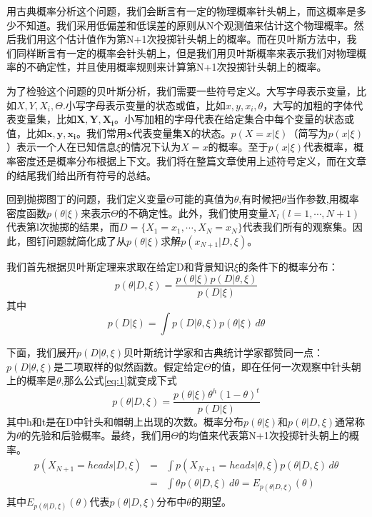 \documentclass[10pt,a4paper]{article}
\begin{document}
\begin{CJK*}{UTF8}{gkai}
用古典概率分析这个问题，我们会断言有一定的物理概率针头朝上，而这概率是多少不知道。我们采用低偏差和低误差的原则从N个观测值来估计这个物理概率。然后我们用这个估计值作为第N+1次投掷针头朝上的概率。而在贝叶斯方法中，我们同样断言有一定的概率会针头朝上，但是我们用贝叶斯概率来表示我们对物理概率的不确定性，并且使用概率规则来计算第N+1次投掷针头朝上的概率。


为了检验这个问题的贝叶斯分析，我们需要一些符号定义。大写字母表示变量，比如$X,Y,X_i,\Theta$.小写字母表示变量的状态或值，比如$x,y,x_i,\theta$，大写的加粗的字体代表变量集，比如$\mathbf{X},\mathbf{Y},\mathbf{X_i}$。小写加粗的字母代表在给定集合中每个变量的状态或值，比如$\mathbf{x},\mathbf{y},\mathbf{x_i}$。我们常用$\mathbf{x}$代表变量集$\mathbf{X}$的状态。$p(X=x|\xi)$（简写为$p(x|\xi)$）表示一个人在已知信息$\xi$的情况下认为$X=x$的概率。至于$p(x|\xi)$代表概率，概率密度还是概率分布根据上下文。我们将在整篇文章使用上述符号定义，而在文章的结尾我们给出所有符号的总结。


回到抛掷图丁的问题，我们定义变量$\Theta$可能的真值为$\theta$,有时候把$\theta$当作参数,用概率密度函数$p(\theta|\xi)$来表示$\Theta$的不确定性。此外，我们使用变量$X_l(l=1,\cdots,N+1)$代表第l次抛掷的结果，而$D=\{X_1=x_1,\cdots,X_N=x_N\}$代表我们所有的观察集。因此，图钉问题就简化成了从$p(\theta|\xi)$求解$p(x_{N+1}|D,\xi)$。


我们首先根据贝叶斯定理来求取在给定D和背景知识$\xi$的条件下的概率分布：
\begin{equation}
\label{eq:1}
p(\theta|D,\xi)=\frac{p(\theta|\xi)p(D|\theta,\xi)}{p(D|\xi)}
\end{equation}
其中
\begin{equation}
p(D|\xi)=\int p(D|\theta,\xi)p(\theta|\xi)\, d\theta
\end{equation}

下面，我们展开$p(D|\theta,\xi)$贝叶斯统计学家和古典统计学家都赞同一点：$p(D|\theta,\xi)$是二项取样的似然函数。假定给定$\Theta$的值，即在任何一次观察中针头朝上的概率是$\theta$,那么公式\ref{eq:1}就变成下式
\begin{equation}
\label{eq:3}
p(\theta|D,\xi)=\frac{p(\theta|\xi)\theta^h(1-\theta)^t}{p(D|\xi)}
\end{equation}
其中h和t是在D中针头和帽朝上出现的次数。概率分布$p(\theta|\xi)$和$p(\theta|D,\xi)$通常称为$\theta$的先验和后验概率。最终，我们用$\Theta$的均值来代表第N+1次投掷针头朝上的概率。
\begin{eqnarray}
p(X_{N+1}=heads|D,\xi)
&=&\int p(X_{N+1}=heads|\theta,\xi)p(\theta|D,\xi)\, d\theta \nonumber \\
&=&\int \theta p(\theta|D,\xi)\, d\theta
=E_{p(\theta|D,\xi)}(\theta)
\end{eqnarray}
其中$E_{p(\theta|D,\xi)}(\theta)$代表$p(\theta|D,\xi)$分布中$\theta$的期望。



\end{CJK*}
\end{document}
